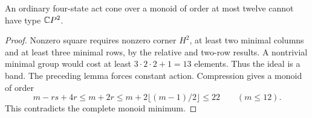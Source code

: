 \begin{corollary}
\label{CP2:A-four-state-small}
An ordinary four-state act cone over a monoid of order
at most twelve cannot have type $\mathbb{C}P^2$.
\end{corollary}
\begin{proof}
Nonzero square requires nonzero corner $H^2$, at least
two minimal columns and at least three minimal rows,
by the relative and two-row results. A nontrivial
minimal group would cost at least $3\cdot2\cdot2+1=13$
elements. Thus the ideal is a band. The preceding
lemma forces constant action. Compression gives
a monoid of order
\[
 m-rs+4r\leq m+2r
 \leq m+2\lfloor(m-1)/2\rfloor\leq22
 \qquad(m\leq12).
\]
This contradicts the complete monoid minimum.
\end{proof}
